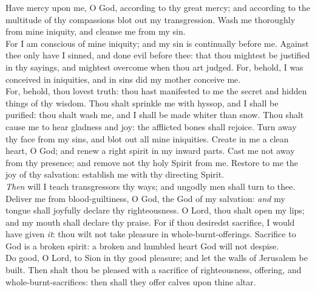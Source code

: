 
 Have mercy upon me, O God, according to thy great mercy; and according to the multitude of thy compassions blot out my transgression. Wash me thoroughly from mine iniquity, and cleanse me from my sin.\\ 
 
 \noindent
 For I am conscious of mine iniquity; and my sin is continually before me. Against thee only have I sinned, and done evil before thee: that thou mightest be justified in thy sayings, and mightest overcome when thou art judged. For, behold, I was conceived in iniquities, and in sins did my mother conceive me.\\
 
 \noindent
 For, behold, thou lovest truth: thou hast manifested to me the secret and hidden things of thy wisdom. Thou shalt sprinkle me with hyssop, and I shall be purified: thou shalt wash me, and I shall be made whiter than snow. Thou shalt cause me to hear gladness and joy: the afflicted bones shall rejoice. Turn away thy face from my sins, and blot out all mine iniquities. Create in me a clean heart, O God; and renew a right spirit in my inward parts. Cast me not away from thy presence; and remove not thy holy Spirit from me. Restore to me the joy of thy salvation: establish me with thy directing Spirit.\\
 
 \noindent
 \textit{Then} will I teach transgressors thy ways; and ungodly men shall turn to thee. Deliver me from blood-guiltiness, O God, the God of my salvation: \textit{and} my tongue shall joyfully declare thy righteousness. O Lord, thou shalt open my lips; and my mouth shall declare thy praise. For if thou desiredst sacrifice, I would have given \textit{it}: thou wilt not take pleasure in whole-burnt-offerings. Sacrifice to God is a broken spirit: a broken and humbled heart God will not despise.\\
  
 \noindent
 Do good, O Lord, to Sion in thy good pleasure; and let the walls of Jerusalem be built. Then shalt thou be pleased with a sacrifice of righteousness, offering, and whole-burnt-sacrifices: then shall they offer calves upon thine altar.